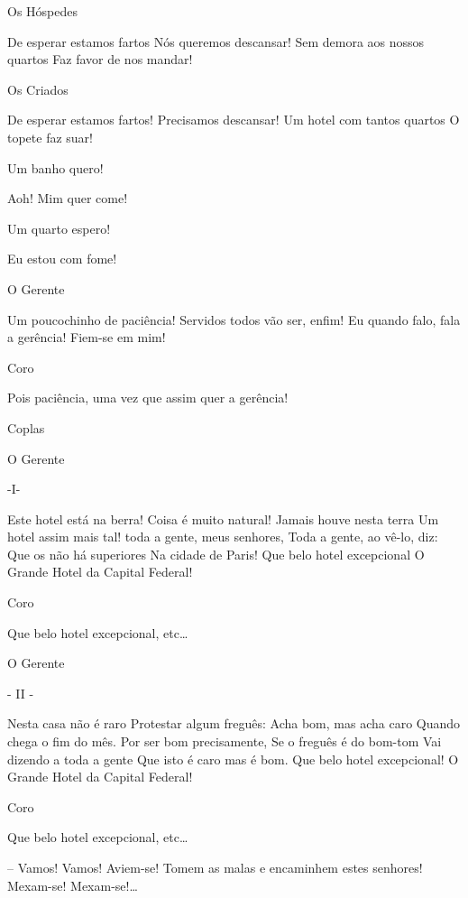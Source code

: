  Os Hóspedes

 De esperar estamos fartos
 Nós queremos descansar!
 Sem demora aos nossos quartos
 Faz favor de nos mandar!

 Os Criados

 De esperar estamos fartos!
 Precisamos descansar!
 Um hotel com tantos quartos
 O topete faz suar!

 Um banho quero!

 Aoh! Mim quer come!

 Um quarto espero!

 Eu estou com fome!

 O Gerente

 Um poucochinho de paciência!
 Servidos todos vão ser, enfim!
 Eu quando falo, fala a gerência!
 Fiem-se em mim!

 Coro

 Pois paciência, uma vez que assim quer a gerência!

 Coplas

 O Gerente

 -I-

 Este hotel está na berra!
 Coisa é muito natural!
 Jamais houve nesta terra
 Um hotel assim mais tal!
 toda a gente, meus senhores,
 Toda a gente, ao vê-lo, diz:
 Que os não há superiores
 Na cidade de Paris!
 Que belo hotel excepcional
 O Grande Hotel da Capital Federal!

 Coro

 Que belo hotel excepcional, etc\ldots{}

 O Gerente

 - II -

 Nesta casa não é raro
 Protestar algum freguês:
 Acha bom, mas acha caro
 Quando chega o fim do mês.
 Por ser bom precisamente,
 Se o freguês é do bom-tom
 Vai dizendo a toda a gente
 Que isto é caro mas é bom.
 Que belo hotel excepcional!
 O Grande Hotel da Capital Federal!

 Coro

 Que belo hotel excepcional, etc\ldots{}

  -- Vamos! Vamos! Aviem-se! Tomem as malas e
encaminhem estes senhores! Mexam-se! Mexam-se!\ldots{} 


